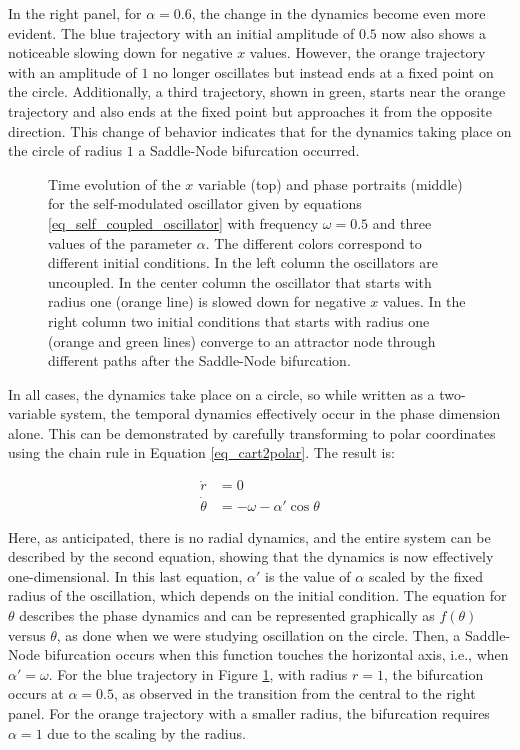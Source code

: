 \documentclass{article}
\begin{document}
In the right panel, for $\alpha = 0.6$, the change in the dynamics become even more evident. 
The blue trajectory with an initial amplitude of $0.5$ now also shows a noticeable slowing down for negative $x$ values. 
However, the orange trajectory with an amplitude of $1$ no longer oscillates but instead ends at a fixed point on the circle. 
Additionally, a third trajectory, shown in green, starts near the orange trajectory and also ends at the fixed point but approaches it from the opposite direction. 
This change of behavior indicates that for the dynamics taking place on the circle of radius $1$ a Saddle-Node bifurcation occurred.

\begin{figure} [h]
    \centerline{}
    \caption{Time evolution of the $x$ variable (top) and phase portraits (middle) for the self-modulated oscillator given by equations \ref{eq_self_coupled_oscillator} with frequency $\omega=0.5$ and three values of the parameter $\alpha$. 
    The different colors correspond to different initial conditions. In the left column the oscillators are uncoupled. In the center column the oscillator that starts with radius one (orange line) is slowed down for negative $x$ values. In the right column two initial conditions that starts with radius one (orange and green lines) converge to an attractor node through different paths after the Saddle-Node bifurcation.
    }
    \label{fig_selfmod}
\end{figure}

In all cases, the dynamics take place on a circle, so while written as a two-variable system, the temporal dynamics effectively occur in the phase dimension alone. This can be demonstrated by carefully transforming to polar coordinates using the chain rule in Equation \ref{eq_cart2polar}. The result is:

\begin{subequations} \label{eq_self_coupled_oscillator_polar}
\begin{align} 
    \dot{r} & = 0 \\
    \dot{\theta} & = -\omega - \alpha' \cos{\theta}
\end{align}
\end{subequations}

Here, as anticipated, there is no radial dynamics, and the entire system can be described by the second equation, showing that the dynamics is now effectively one-dimensional.
In this last equation, $\alpha'$ is the value of $\alpha$ scaled by the fixed radius of the oscillation, which depends on the initial condition. 
The equation for $\theta$ describes the phase dynamics and can be represented graphically as $f(\theta)$ versus $\theta$, as done when we were studying oscillation on the circle. 
Then, a Saddle-Node bifurcation occurs when this function touches the horizontal axis, i.e., when $\alpha' = \omega$. For the blue trajectory in Figure \ref{fig_selfmod}, with radius $r = 1$, the bifurcation occurs at $\alpha = 0.5$, as observed in the transition from the central to the right panel. For the orange trajectory with a smaller radius, the bifurcation requires $\alpha = 1$ due to the scaling by the radius.
\end{document}

